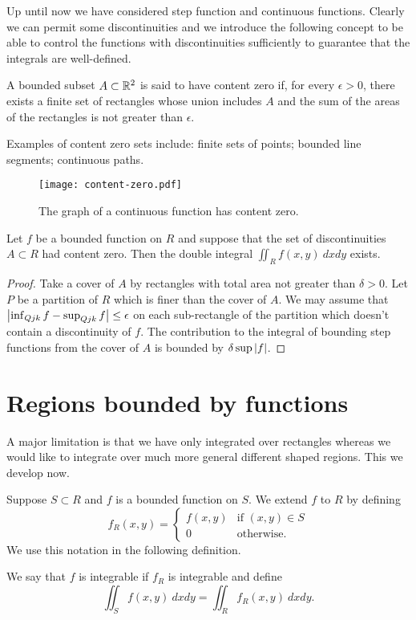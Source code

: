Up until now we have considered step function and continuous functions.
Clearly we can permit some discontinuities and we introduce the following concept to be able to control the functions with discontinuities sufficiently to guarantee that the integrals are well-defined.
%
\begin{definition*}
    A bounded subset \(A\subset \mathbb{R}^2\) is said to have content zero if, for every \(\epsilon>0\), there exists a finite set of rectangles whose union includes \(A\) and the sum of the areas of the rectangles is not greater than \(\epsilon\).
\end{definition*}
%
Examples of content zero sets include: finite sets of points; bounded line segments; continuous paths.

\begin{figure}
    \centering
    \texttt{[image: content-zero.pdf]}
    \caption{The graph of a continuous function has content zero.}
\end{figure}

\begin{theorem*}
    Let \(f\) be a bounded function on \(R\) and suppose that the set of discontinuities \(A\subset R\) had content zero. Then the double integral \(\iint_{R}f(x,y) \ dx dy\) exists.
\end{theorem*}
\begin{proof}
    Take a cover of \(A\) by rectangles with total area not greater than \(\delta>0\).
    Let \(P\) be a partition of \(R\) which is finer than the cover of \(A\).
    We may assume that \(\left|\inf_{Q{jk}} f - \sup_{Q{jk}} f \right|\leq \epsilon\)  on each sub-rectangle of the partition which doesn't contain a discontinuity of \(f\).
    The contribution to the integral of bounding step functions from the cover of \(A\) is bounded by \(\delta \sup \left|f\right|\).
\end{proof}

\section{Regions bounded by functions}

A major limitation is that we have only integrated over rectangles whereas we would like to integrate over much more general different shaped regions.
This we develop now.

Suppose \(S\subset R\) and \(f\) is a bounded function on \(S\).
We extend \(f\) to \(R\) by defining
\[
    f_R(x,y) = \begin{cases}
        f(x,y) & \text{if \((x,y)\in S\)} \\
        0      & \text{otherwise}.
    \end{cases}
\]
We use this notation in the following definition.
%
\begin{definition*}
    We say that \(f\) is integrable if \(f_{R}\) is integrable and define
    \[
        \iint_{S} f(x,y) \ dx dy = \iint_{R} f_{R}(x,y) \ dx dy.
    \]
\end{definition*}

